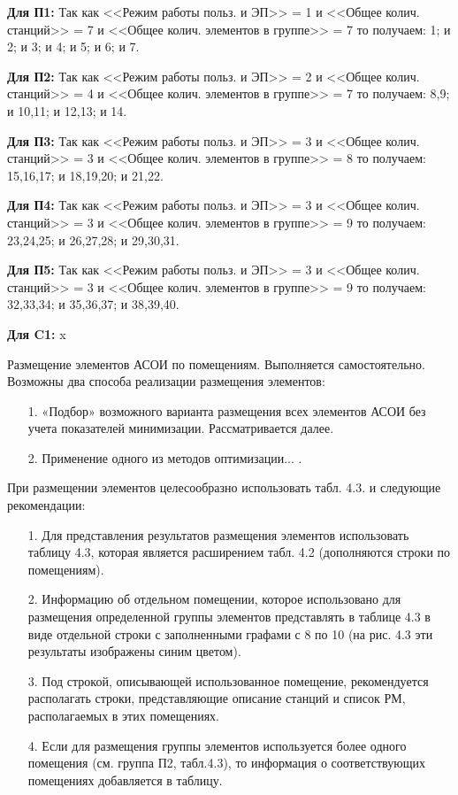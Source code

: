 \documentclass[12pt, a4paper, simple]{eskdtext}
\begin{document}
    \textbf{Для П1:} Так как <<Режим работы польз. и ЭП>> = 1 и <<Общее колич. станций>> = 7 и <<Общее колич. элементов в группе>> = 7
    то получаем: 1; и 2; и 3; и 4; и 5; и 6; и 7.

    \textbf{Для П2:} Так как <<Режим работы польз. и ЭП>> = 2 и <<Общее колич. станций>> = 4 и <<Общее колич. элементов в группе>> = 7
    то получаем: 8,9; и 10,11; и 12,13; и 14.

    \textbf{Для П3:} Так как <<Режим работы польз. и ЭП>> = 3 и <<Общее колич. станций>> = 3 и <<Общее колич. элементов в группе>> = 8
    то получаем: 15,16,17; и 18,19,20; и 21,22.

    \textbf{Для П4:} Так как <<Режим работы польз. и ЭП>> = 3 и <<Общее колич. станций>> = 3 и <<Общее колич. элементов в группе>> = 9
    то получаем: 23,24,25; и 26,27,28; и 29,30,31.

    \textbf{Для П5:} Так как <<Режим работы польз. и ЭП>> = 3 и <<Общее колич. станций>> = 3 и <<Общее колич. элементов в группе>> = 9
    то получаем: 32,33,34; и 35,36,37; и 38,39,40.

    \textbf{Для C1:} x

    \newpage

    Размещение элементов АСОИ по помещениям.
    Выполняется самостоятельно.
    Возможны два способа реализации размещения элементов:

    \begin{enumerate}
        \item[1.] «Подбор» возможного варианта размещения всех элементов АСОИ без учета показателей мини­мизации.
        Рассматривается далее.
        \item[2.] Применение одного из методов оптимизации... . 
    \end{enumerate}

    При размещении элементов целесообразно использовать табл. 4.3. и следующие рекомендации:
    \begin{enumerate}
        \item[1.] Для представления результатов размещения элементов использовать таблицу 4.3,
        которая явля­ется расширением табл. 4.2 (дополняются строки по помещениям).
        \item[2.] Информацию об отдельном помещении, которое использовано для размещения определенной группы элементов
        представлять в таблице 4.3 в виде отдельной строки с заполненными гра­фами с 8 по 10
        (на рис. 4.3 эти результаты изображены синим цветом). 
        \item[3.] Под строкой, описывающей использованное помещение, рекомендуется располагать строки,
        пред­ставляющие описание станций и список РМ, располагаемых в этих помещениях.
        \item[4.] Если для размещения группы элементов используется более одного помещения
        (см. группа П2, табл.4.3), то информация о соответствующих помещениях добавляется в таблицу. 
    \end{enumerate}
\end{document}
